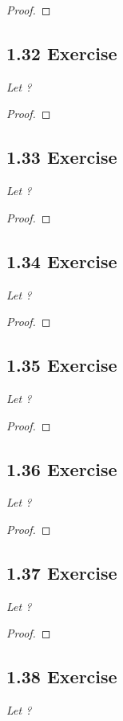 \documentclass{article}
\begin{document}
\begin{proof}
\end{proof}

\subsection*{1.32 Exercise} 
\quad \textit{Let ?}

\begin{proof}
\end{proof}

\subsection*{1.33 Exercise} 
\quad \textit{Let ?}

\begin{proof}
\end{proof}

\subsection*{1.34 Exercise} 
\quad \textit{Let ?}

\begin{proof}
\end{proof}

\subsection*{1.35 Exercise} 
\quad \textit{Let ?}

\begin{proof}
\end{proof}

\subsection*{1.36 Exercise} 
\quad \textit{Let ?}

\begin{proof}
\end{proof}

\subsection*{1.37 Exercise} 
\quad \textit{Let ?}

\begin{proof}
\end{proof}

\subsection*{1.38 Exercise} 
\quad \textit{Let ?}
\end{document}
